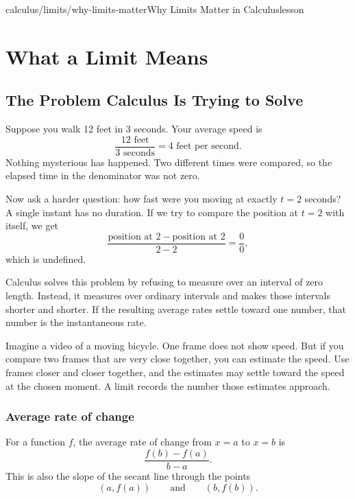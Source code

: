 \begin{webpage}{calculus/limits/why-limits-matter}{Why Limits Matter in Calculus}{lesson}
\chapter{What a Limit Means}

\section{The Problem Calculus Is Trying to Solve}


Suppose you walk 12 feet in 3 seconds. Your average speed is
\[
  \frac{12\text{ feet}}{3\text{ seconds}}=4\text{ feet per second}.
\]
Nothing mysterious has happened. Two different times were compared, so the elapsed time in the denominator was not zero.

Now ask a harder question: how fast were you moving at exactly \(t=2\) seconds? A single instant has no duration. If we try to compare the position at \(t=2\) with itself, we get
\[
  \frac{\text{position at }2-\text{position at }2}{2-2}
  =\frac00,
\]
which is undefined.

Calculus solves this problem by refusing to measure over an interval of zero length. Instead, it measures over ordinary intervals and makes those intervals shorter and shorter. If the resulting average rates settle toward one number, that number is the instantaneous rate.

\begin{bgconcept}
Imagine a video of a moving bicycle. One frame does not show speed. But if you compare two frames that are very close together, you can estimate the speed. Use frames closer and closer together, and the estimates may settle toward the speed at the chosen moment. A limit records the number those estimates approach.
\end{bgconcept}

\subsection{Average rate of change}

For a function \(f\), the average rate of change from \(x=a\) to \(x=b\) is
\[
  \boxed{\frac{f(b)-f(a)}{b-a}}.
\]
This is also the slope of the secant line through the points
\[
  (a,f(a))\qquad\text{and}\qquad(b,f(b)).
\]


\end{webpage}
